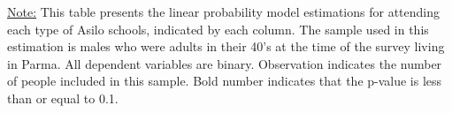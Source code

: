 \begin{footnotesize}
\noindent\underline{Note:} This table presents the linear probability model estimations for attending each type of Asilo schools, indicated by each column. The sample used in this estimation is males who were adults in their 40's at the time of the survey living in Parma. All dependent variables are binary. Observation indicates the number of people included in this sample. Bold number indicates that the p-value is less than or equal to 0.1.
\end{footnotesize}
